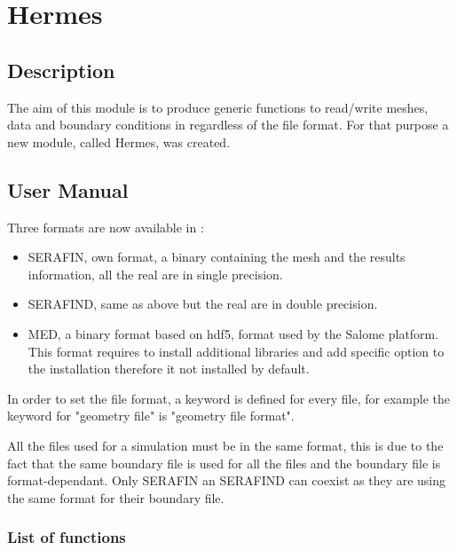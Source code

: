 \chapter{Hermes}
\label{ref:hermes}
\section{Description}
%
The aim of this module is to produce generic functions to read/write meshes,
data and boundary conditions in \telemacsystem regardless of the file format. For that
purpose a new module, called Hermes, was created.
%
\section{User Manual}
%
Three formats are now available in \telemacsystem:
\begin{itemize}
\item SERAFIN, \telemacsystem own format, a binary containing the mesh and the results
information, all the real are in single precision.
\item SERAFIND, same as above but the real are in double precision.
\item MED, a binary format based on hdf5, format used by the Salome platform.
This format requires to install additional libraries and add specific option
to the \telemacsystem installation therefore it not installed by default.
\end{itemize}

In order to set the file format, a keyword is defined for every file, for
example the keyword for "geometry file" is "geometry file format".

All the files used for a simulation must be in the same format, this is due to
the fact that the same boundary file is used for all the files and the boundary
file is format-dependant. Only SERAFIN an SERAFIND can coexist as they are
using the same format for their boundary file.
\subsection{List of functions}
\label{listfunc}
